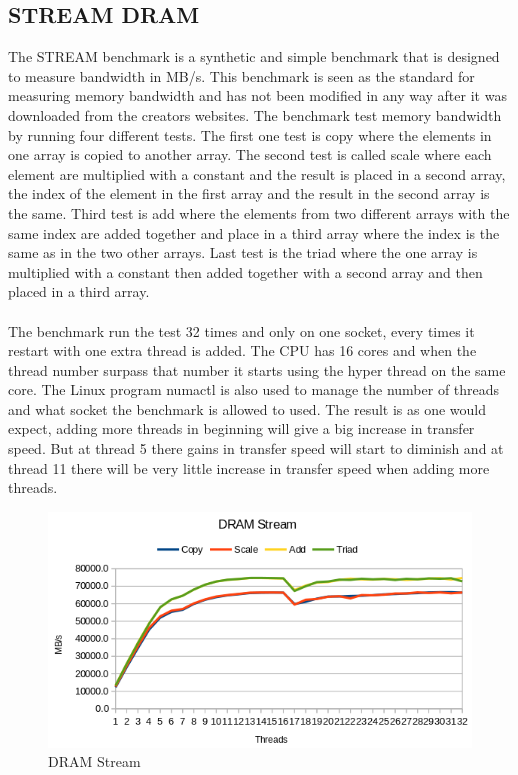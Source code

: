 \documentclass[12pt,a4paper,USenglish]{article}      %
\begin{document}
\subsection{STREAM DRAM}
The STREAM\cite{STREAM-c} benchmark is a synthetic and simple benchmark that is designed to measure bandwidth in MB/s. This benchmark is seen as the standard for measuring memory bandwidth and has not been modified in any way after it was downloaded from the creators websites.
The benchmark test memory bandwidth by running four different tests. The first one test is copy where the elements in one array is copied to another array.
The second test is called scale where each element are multiplied with a constant and the result is placed in a second array, the index of the element in the first array and the result in the second array is the same.
Third test is add where the elements from two different arrays with the same index are added together and place in a third array where the index is the same as in the two other arrays.
Last test is the triad where the one array is multiplied with a constant then added together with a second array and then placed in a third array.
\\
\\
The benchmark run the test 32 times and only on one socket, every times it restart with one extra thread is added. The CPU has 16 cores and when the thread number surpass that number it starts using the hyper thread on the same core. The Linux program numactl is also used to manage the number of threads and what socket the benchmark is allowed to used.
The result is as one would expect, adding more threads in beginning will give a big increase in transfer speed. But at thread 5 there gains in transfer speed will start to diminish and at thread 11 there will be very little increase in transfer speed when adding more threads.

\begin{figure}[!hbtp]
\includegraphics[scale=0.7]{DRAM_stream2.png}
\caption{DRAM Stream}
\end{figure}
\end{document}
